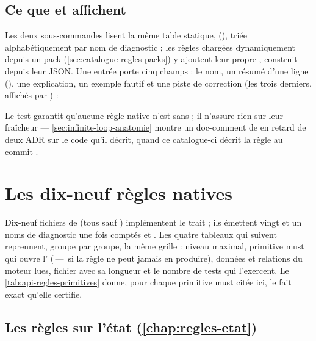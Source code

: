 \subsection{Ce que  et  affichent}

Les deux sous-commandes lisent la même table statique,  (), triée alphabétiquement par nom de diagnostic ; les règles chargées dynamiquement depuis un pack (\cref{sec:catalogue-regles-packs}) y ajoutent leur propre , construit depuis leur JSON. Une entrée porte cinq champs : le nom, un résumé d'une ligne (), une explication, un exemple fautif et une piste de correction (les trois derniers, affichés par ) :


Le test  garantit qu'aucune règle native n'est sans  ; il n'assure rien sur leur fraîcheur --- \cref{sec:infinite-loop-anatomie} montre un doc-comment de  en retard de deux ADR sur le code qu'il décrit, quand ce catalogue-ci décrit la règle au commit \snapshotCommit.

\section{Les dix-neuf règles natives}
\label{sec:catalogue-regles-natives}

Dix-neuf fichiers de  (tous sauf ) implémentent le trait  ; ils émettent vingt et un noms de diagnostic une fois comptés  et . Les quatre tableaux qui suivent reprennent, groupe par groupe, la même grille : niveau maximal, primitive must qui ouvre l'\Error{} (\og\,---\,\fg{} si la règle ne peut jamais en produire), données et relations du moteur lues, fichier avec sa longueur et le nombre de tests qui l'exercent. Le \cref{tab:api-regles-primitives} donne, pour chaque primitive must citée ici, le fait exact qu'elle certifie.

\subsection{Les règles sur l'état (\cref{chap:regles-etat})}

